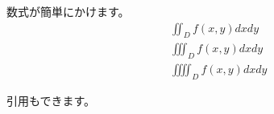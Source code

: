 \documentclass[10pt,a4paper,twocolumn]{ltjsarticle}
\begin{document}
数式が簡単にかけます。
\begin{eqnarray}
  && \iint_D f(x,y) dxdy \\
  && \iiint_D f(x,y) dxdy \\
  && \iiiint_D f(x,y) dxdy
\end{eqnarray}

引用\cite{Karras2018ASG}もできます。\cite{SALMAN2018221}


\end{document}
